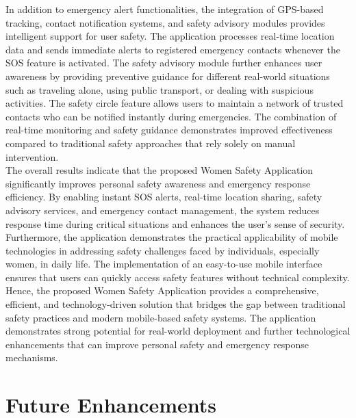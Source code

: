 \documentclass[a4paper,12pt]{report}
\begin{document}
In addition to emergency alert functionalities, the integration of GPS-based tracking, contact notification systems, and safety advisory modules provides intelligent support for user safety. The application processes real-time location data and sends immediate alerts to registered emergency contacts whenever the SOS feature is activated. The safety advisory module further enhances user awareness by providing preventive guidance for different real-world situations such as traveling alone, using public transport, or dealing with suspicious activities. The safety circle feature allows users to maintain a network of trusted contacts who can be notified instantly during emergencies. The combination of real-time monitoring and safety guidance demonstrates improved effectiveness compared to traditional safety approaches that rely solely on manual intervention.\\

The overall results indicate that the proposed Women Safety Application significantly improves personal safety awareness and emergency response efficiency. By enabling instant SOS alerts, real-time location sharing, safety advisory services, and emergency contact management, the system reduces response time during critical situations and enhances the user's sense of security. Furthermore, the application demonstrates the practical applicability of mobile technologies in addressing safety challenges faced by individuals, especially women, in daily life. The implementation of an easy-to-use mobile interface ensures that users can quickly access safety features without technical complexity.\\

Hence, the proposed Women Safety Application provides a comprehensive, efficient, and technology-driven solution that bridges the gap between traditional safety practices and modern mobile-based safety systems. The application demonstrates strong potential for real-world deployment and further technological enhancements that can improve personal safety and emergency response mechanisms.\\

\section{Future Enhancements}
\end{document}

